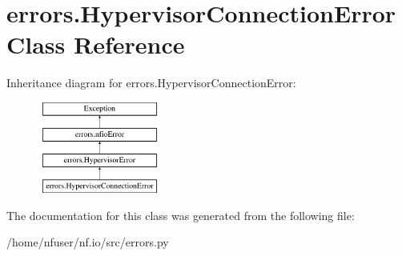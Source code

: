 \hypertarget{classerrors_1_1HypervisorConnectionError}{\section{errors.\-Hypervisor\-Connection\-Error Class Reference}
\label{classerrors_1_1HypervisorConnectionError}
}
Inheritance diagram for errors.\-Hypervisor\-Connection\-Error\-:\begin{figure}[H]
\begin{center}
\leavevmode
\includegraphics[height=3.000000cm]{classerrors_1_1HypervisorConnectionError}
\end{center}
\end{figure}


The documentation for this class was generated from the following file\-:\begin{DoxyCompactItemize}
\item 
/home/nfuser/nf.\-io/src/errors.\-py\end{DoxyCompactItemize}
